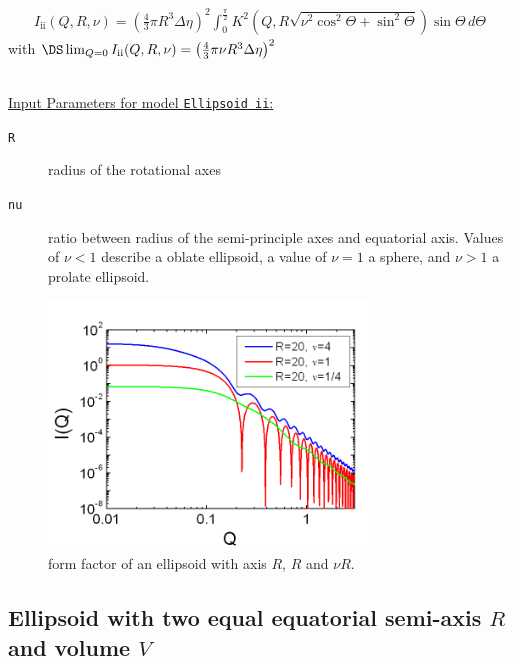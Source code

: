 \begin{align}
I_\text{ii}(Q,R,\nu) = \left( \frac{4}{3}\pi R^3 \Delta\eta
\right)^2
 \int_0^{\frac{\pi}{2}}\! K^2\left(Q,R\sqrt{\nu^2\cos^2\Theta+\sin^2\Theta}\right) \sin\Theta\, d\Theta
\end{align}
with $\DS \lim_{Q=0} I_\text{ii}(Q,R,\nu)= \left( \frac{4}{3}\pi
\nu R^3 \Delta\eta \right)^2 $

~\\
\underline{Input Parameters for model \texttt{Ellipsoid ii}:}
\begin{description}
\item[\texttt{R}] radius of the rotational axes
\item[\texttt{nu}]
ratio between radius of the semi-principle axes and equatorial axis.
Values of $\nu<1$ describe a oblate ellipsoid, a value of $\nu=1$ a
sphere, and $\nu>1$ a prolate ellipsoid.
\end{description}

\begin{figure}[htb]
\begin{center}
\includegraphics[width=0.768\textwidth,height=0.588\textwidth]{../images/form_factor/Ellipsoid/ellipsoid_ii.png}
\end{center}
\caption{form factor of an ellipsoid with axis $R$, $R$ and $\nu
R$.} \label{fig:I_ellipsoid_ii}
\end{figure}
\clearpage
\subsection{Ellipsoid with two equal equatorial semi-axis $R$ and volume $V$}
\label{sect:Ellipsoid_i} ~\\

